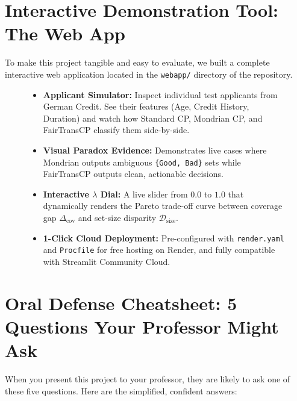 \documentclass[11pt,a4paper]{article}
\begin{document}
\section{Interactive Demonstration Tool: The Web App}

To make this project tangible and easy to evaluate, we built a complete interactive web application located in the \texttt{webapp/} directory of the repository.

\begin{figure}[htbp]
\centering
\begin{tcolorbox}[colback=lightbg, colframe=accentblue, title=Features of the Interactive Web App (\texttt{webapp/app.py})]
\begin{itemize}[leftmargin=1.5em]
    \item \textbf{Applicant Simulator:} Inspect individual test applicants from German Credit. See their features (Age, Credit History, Duration) and watch how Standard CP, Mondrian CP, and FairTransCP classify them side-by-side.
    \item \textbf{Visual Paradox Evidence:} Demonstrates live cases where Mondrian outputs ambiguous \texttt{\{Good, Bad\}} sets while FairTransCP outputs clean, actionable decisions.
    \item \textbf{Interactive $\lambda$ Dial:} A live slider from $0.0$ to $1.0$ that dynamically renders the Pareto trade-off curve between coverage gap $\Delta_{\text{cov}}$ and set-size disparity $\mathcal{D}_{\text{size}}$.
    \item \textbf{1-Click Cloud Deployment:} Pre-configured with \texttt{render.yaml} and \texttt{Procfile} for free hosting on Render, and fully compatible with Streamlit Community Cloud.
\end{itemize}
\end{tcolorbox}
\end{figure}

\section{Oral Defense Cheatsheet: 5 Questions Your Professor Might Ask}

When you present this project to your professor, they are likely to ask one of these five questions. Here are the simplified, confident answers:
\end{document}
